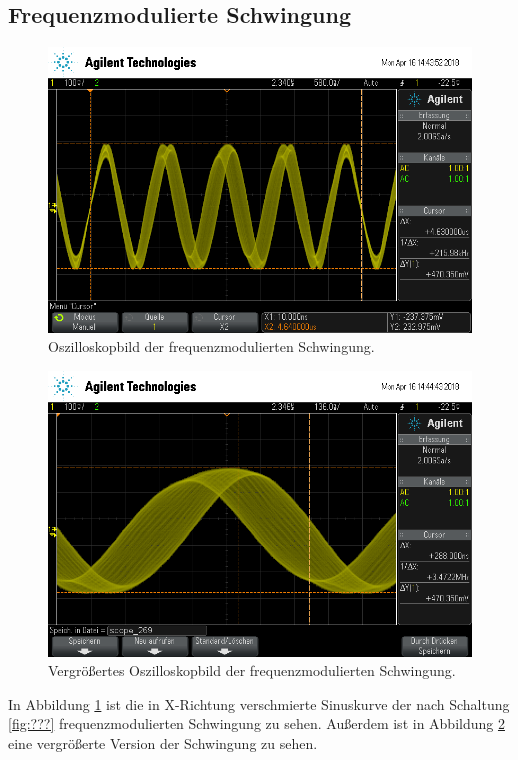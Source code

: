 \subsection{Frequenzmodulierte Schwingung}

\begin{figure}[H]
  \centering
  \includegraphics[width=\textwidth]{Oszi_Pics/freqModRing.png}
  \caption{Oszilloskopbild der frequenzmodulierten Schwingung.}
  \label{fig:freqModRing}
\end{figure}

\begin{figure}[H]
  \centering
  \includegraphics[width=\textwidth]{Oszi_Pics/freqModZoom.png}
  \caption{Vergrößertes Oszilloskopbild der frequenzmodulierten Schwingung.}
  \label{fig:freqModZoom}
\end{figure}

In Abbildung \ref{fig:freqModRing} ist die in X-Richtung verschmierte Sinuskurve der nach Schaltung \ref{fig:???} frequenzmodulierten Schwingung zu sehen. Außerdem ist in Abbildung \ref{fig:freqModZoom} eine vergrößerte Version der Schwingung zu sehen. 


